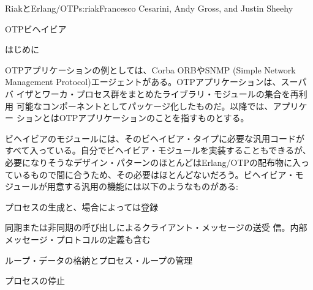 \begin{aosachapter}{RiakとErlang/OTP}{s:riak}{Francesco Cesarini, Andy Gross, and Justin Sheehy}
\begin{aosasect1}{OTPビヘイビア}
\begin{aosasect2}{はじめに}

OTPアプリケーションの例としては、Corba ORBやSNMP (Simple Network
Management Protocol)エージェントがある。OTPアプリケーションは、スーパバ
イザとワーカ・プロセス群をまとめたライブラリ・モジュールの集合を再利用
可能なコンポーネントとしてパッケージ化したものだ。以降では、アプリケー
ションとはOTPアプリケーションのことを指すものとする。


ビヘイビアのモジュールには、そのビヘイビア・タイプに必要な汎用コードが
すべて入っている。自分でビヘイビア・モジュールを実装することもできるが、
必要になりそうなデザイン・パターンのほとんどはErlang/OTPの配布物に入っ
ているもので間に合うため、その必要はほとんどないだろう。ビヘイビア・モ
ジュールが用意する汎用の機能には以下のようなものがある:

\begin{aosaitemize}

  \item プロセスの生成と、場合によっては登録

  \item 同期または非同期の呼び出しによるクライアント・メッセージの送受
    信。内部メッセージ・プロトコルの定義も含む

  \item ループ・データの格納とプロセス・ループの管理

  \item プロセスの停止


\end{aosaitemize}
\end{aosasect2}
\end{aosasect1}
\end{aosachapter}
